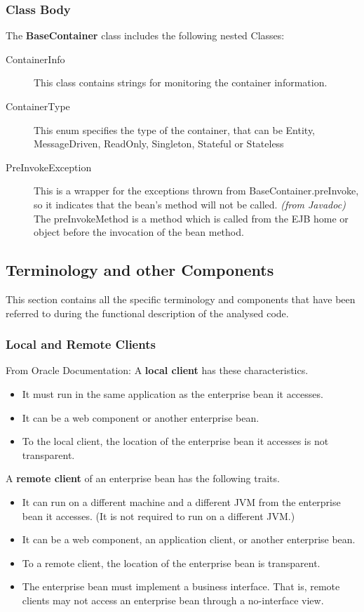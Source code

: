 \documentclass[11pt, a4paper,titlepage]{article}
\begin{document}
	 \subsubsection{Class Body}
	 The \textbf{BaseContainer} class includes the following nested Classes:
			\begin{description}
				\item[ContainerInfo] This class contains strings for monitoring the container information.
				\item[ContainerType] This enum specifies the type of the container, that can be Entity, MessageDriven, ReadOnly, Singleton, Stateful or Stateless
				\item[PreInvokeException] This is a wrapper for the exceptions thrown from BaseContainer.preInvoke, so it indicates that the bean's method will not be called. \textit{(from Javadoc)}
				The preInvokeMethod is a method which is called from the EJB home or object before the invocation of the bean method.
			\end{description}
	\newpage
	\subsection{Terminology and other Components}
	This section contains all the specific terminology and components that have been referred to during the functional description of the analysed code.
	
	\subsubsection{Local and Remote Clients}
	From Oracle Documentation: \newline
	A \textbf{local client} has these characteristics.
	\begin{itemize}
			\item It must run in the same application as the enterprise bean it accesses.
			\item It can be a web component or another enterprise bean.
			\item To the local client, the location of the enterprise bean it accesses is not transparent.
	\end{itemize}
	A \textbf{remote client} of an enterprise bean has the following traits.
	\begin{itemize}
		\item It can run on a different machine and a different JVM from the enterprise bean it accesses. (It is not required to run on a different JVM.)
		\item It can be a web component, an application client, or another enterprise bean.
		\item To a remote client, the location of the enterprise bean is transparent.
		\item The enterprise bean must implement a business interface. That is, remote clients may not access an enterprise bean through a no-interface view.
	\end{itemize}
\end{document}

